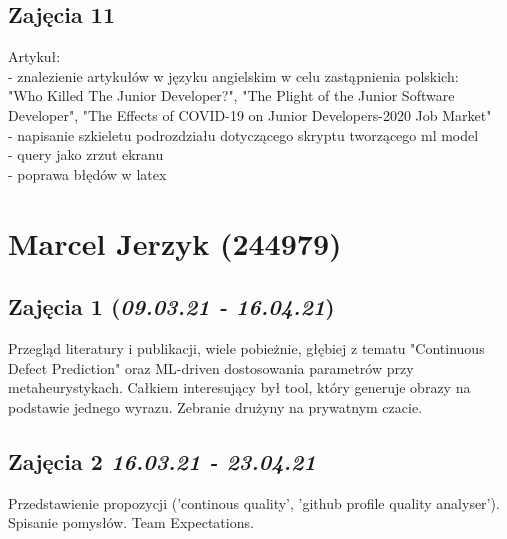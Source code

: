 \documentclass[graybox]{svmult}
\begin{document}
\subsection{Zajęcia 11}
Artykuł:\\
- znalezienie artykułów w języku angielskim w celu zastąpnienia polskich:\\
"Who Killed The Junior Developer?", "The Plight of the Junior Software Developer", "The Effects of COVID-19 on Junior Developers-2020 Job Market"\\
- napisanie szkieletu podrozdziału dotyczącego skryptu tworzącego ml model\\
- query jako zrzut ekranu\\
- poprawa błędów w latex\\


\newpage

\section{Marcel Jerzyk (244979)}
\subsection{Zajęcia 1 (\emph{09.03.21 - 16.04.21})}
Przegląd literatury i publikacji, wiele pobieżnie, głębiej z tematu "Continuous Defect Prediction" oraz ML-driven dostosowania parametrów przy metaheurystykach. Całkiem interesujący był tool, który generuje obrazy na podstawie jednego wyrazu. Zebranie drużyny na prywatnym czacie.
\subsection{Zajęcia 2 \emph{16.03.21 - 23.04.21}}
Przedstawienie propozycji ('continous quality', 'github profile quality analyser'). Spisanie pomysłów. Team Expectations.
\end{document}
